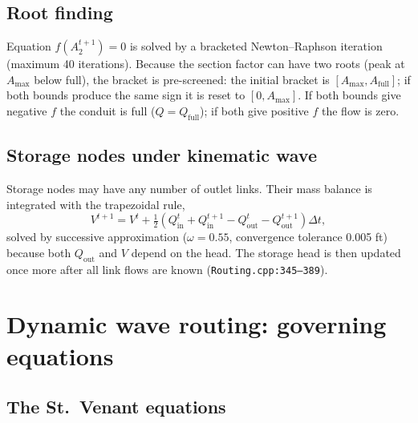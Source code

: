 \documentclass[11pt,a4paper]{article}
\begin{document}
\subsection{Root finding}

Equation $f(A_2^{t+1}) = 0$ is solved by a bracketed Newton--Raphson iteration
(maximum 40 iterations). Because the section factor can have two roots
(peak at $A_{\max}$ below full), the bracket is pre-screened: the initial
bracket is $[A_{\max}, A_{\mathrm{full}}]$; if both bounds produce the same
sign it is reset to $[0, A_{\max}]$. If both bounds give negative $f$ the
conduit is full ($Q = Q_{\mathrm{full}}$); if both give positive $f$ the flow
is zero.

\subsection{Storage nodes under kinematic wave}

Storage nodes may have any number of outlet links. Their mass balance is
integrated with the trapezoidal rule,
\begin{equation}
  V^{t+1} = V^{t} + \tfrac{1}{2}\left(Q_{\mathrm{in}}^{t} + Q_{\mathrm{in}}^{t+1}
  - Q_{\mathrm{out}}^{t} - Q_{\mathrm{out}}^{t+1}\right)\Delta t,
\end{equation}
solved by successive approximation ($\omega = 0.55$, convergence tolerance
0.005 ft) because both $Q_{\mathrm{out}}$ and $V$ depend on the head. The
storage head is then updated once more after all link flows are known
(\texttt{Routing.cpp:345--389}).

\section{Dynamic wave routing: governing equations}

\subsection{The St.\ Venant equations}
\end{document}
